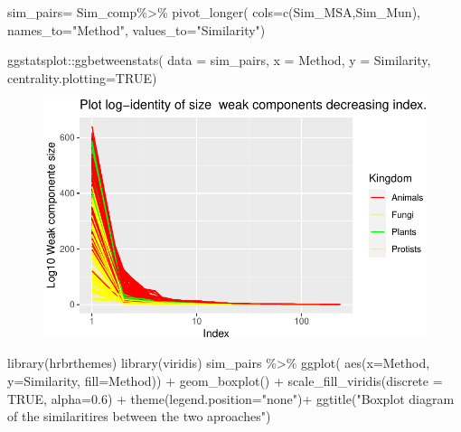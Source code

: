 \documentclass[
  letterpaper,
  DIV=11,
  numbers=noendperiod]{scrreprt}
\newenvironment{Shaded}{}{}
\newcommand{\AttributeTok}[1]{\textcolor[rgb]{0.78,0.47,0.87}{#1}}
\newcommand{\ConstantTok}[1]{\textcolor[rgb]{0.82,0.60,0.40}{#1}}
\newcommand{\FloatTok}[1]{\textcolor[rgb]{0.82,0.60,0.40}{#1}}
\newcommand{\FunctionTok}[1]{\textcolor[rgb]{0.38,0.69,0.94}{#1}}
\newcommand{\NormalTok}[1]{\textcolor[rgb]{0.67,0.70,0.75}{#1}}
\newcommand{\OtherTok}[1]{\textcolor[rgb]{0.15,0.68,0.38}{#1}}
\newcommand{\SpecialCharTok}[1]{\textcolor[rgb]{0.34,0.71,0.76}{#1}}
\newcommand{\StringTok}[1]{\textcolor[rgb]{0.60,0.76,0.47}{#1}}
\begin{document}
\begin{Shaded}
\begin{Highlighting}[]
\NormalTok{sim\_pairs}\OtherTok{=}\NormalTok{ Sim\_comp}\SpecialCharTok{\%\textgreater{}\%} \FunctionTok{pivot\_longer}\NormalTok{(}
  \AttributeTok{cols=}\FunctionTok{c}\NormalTok{(Sim\_MSA,Sim\_Mun),}
  \AttributeTok{names\_to=}\StringTok{"Method"}\NormalTok{,}
  \AttributeTok{values\_to=}\StringTok{"Similarity"}\NormalTok{)}

\NormalTok{ggstatsplot}\SpecialCharTok{::}\FunctionTok{ggbetweenstats}\NormalTok{(}
  \AttributeTok{data =}\NormalTok{ sim\_pairs,}
  \AttributeTok{x =}\NormalTok{ Method,}
  \AttributeTok{y =}\NormalTok{ Similarity,}
  \AttributeTok{centrality.plotting=}\ConstantTok{TRUE}\NormalTok{)}
\end{Highlighting}
\end{Shaded}

\begin{figure}[H]

{\centering \includegraphics[width=1\textwidth,height=\textheight]{index_files/figure-pdf/unnamed-chunk-53-1.pdf}

}

\end{figure}

\begin{Shaded}
\begin{Highlighting}[]
\FunctionTok{library}\NormalTok{(hrbrthemes)}
\FunctionTok{library}\NormalTok{(viridis)}
\NormalTok{sim\_pairs }\SpecialCharTok{\%\textgreater{}\%}
  \FunctionTok{ggplot}\NormalTok{( }\FunctionTok{aes}\NormalTok{(}\AttributeTok{x=}\NormalTok{Method, }\AttributeTok{y=}\NormalTok{Similarity, }\AttributeTok{fill=}\NormalTok{Method)) }\SpecialCharTok{+}
  \FunctionTok{geom\_boxplot}\NormalTok{() }\SpecialCharTok{+}
  \FunctionTok{scale\_fill\_viridis}\NormalTok{(}\AttributeTok{discrete =} \ConstantTok{TRUE}\NormalTok{, }\AttributeTok{alpha=}\FloatTok{0.6}\NormalTok{) }\SpecialCharTok{+}
  \FunctionTok{theme}\NormalTok{(}\AttributeTok{legend.position=}\StringTok{"none"}\NormalTok{)}\SpecialCharTok{+}
  \FunctionTok{ggtitle}\NormalTok{(}\StringTok{"Boxplot diagram of the similaritires between the two aproaches"}\NormalTok{) }
\end{Highlighting}
\end{Shaded}
\end{document}

